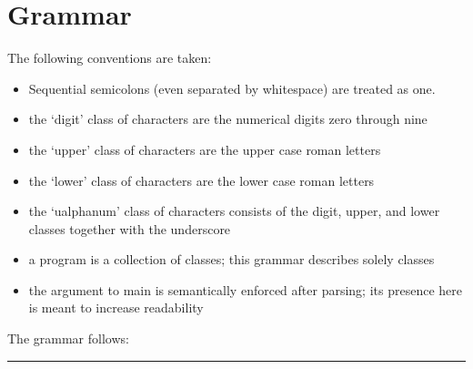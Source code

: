 \newcommand{\comment}[1]{{\escapegrammar$\bullet$\it\ #1}\\}

\section{Grammar}

The following conventions are taken:

\begin{itemize}
\item Sequential semicolons (even separated by whitespace) are treated as one.
\item the `digit' class of characters are the numerical digits zero through nine
\item the `upper' class of characters are the upper case roman letters
\item the `lower' class of characters are the lower case roman letters
\item the `ualphanum' class of characters consists of the digit, upper, and lower classes together with the underscore
\item a program is a collection of classes; this grammar describes solely classes
\item the argument to main is semantically enforced after parsing; its presence here is meant to increase readability
\end{itemize}

The grammar follows:\\

\noindent\hrule

